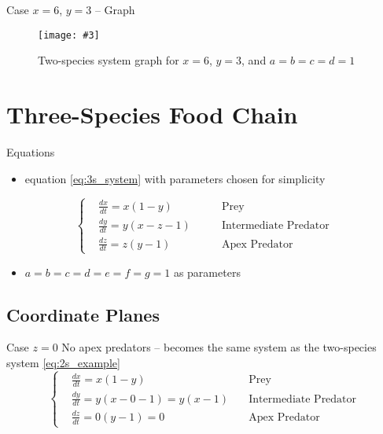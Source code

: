 \documentclass[hyperref={colorlinks,allcolors=black}]{beamer}
\newcommand{\makefig}[4]{
    \begin{figure}[#1]
        \captionsetup{justification=centering}
        \texttt{[image: \#3]}
        \caption{#4}
        \label{fig:#3}
    \end{figure}
}
\begin{document}
\begin{frame}{Case $x=6$, $y=3$ -- Graph}
    \makefig{h}{0.9\textwidth}{2s_graph}
        {Two-species system graph for $x=6$, $y=3$, and $a=b=c=d=1$}
\end{frame}


\section{Three-Species Food Chain}

\begin{frame}{Equations}
    \begin{itemize}\setlength\itemsep{1em}
        \item equation \eqref{eq:3s_system} with parameters chosen for
            simplicity
    \end{itemize}
%
    \begin{equation}
        \left\{\begin{aligned}
            &\frac{dx}{dt} = x(1-y)          &\text{Prey}\\
            &\frac{dy}{dt} = y(x-z-1) \qquad &\text{Intermediate Predator}\\
            &\frac{dz}{dt} = z(y-1)          &\text{Apex Predator}
        \end{aligned}\right.
        \label{eq:3s_example}
    \end{equation}
%
    \begin{itemize}\setlength\itemsep{1em}
        \item $a=b=c=d=e=f=g=1$ as parameters
    \end{itemize}
\end{frame}

\subsection{Coordinate Planes}

\begin{frame}{Case $z=0$}
    No apex predators -- becomes the same system as the two-species system
    \eqref{eq:2s_example}
    \begin{equation}\nonumber
        \left\{\begin{aligned}
            &\frac{dx}{dt}=x(1-y)                &\text{Prey}\\
            &\frac{dy}{dt}=y(x-0-1)=y(x-1)\quad &\text{Intermediate Predator}\\
            &\frac{dz}{dt}=0(y-1)=0              &\text{Apex Predator}
        \end{aligned}\right.
    \end{equation}
\end{frame}
\end{document}
